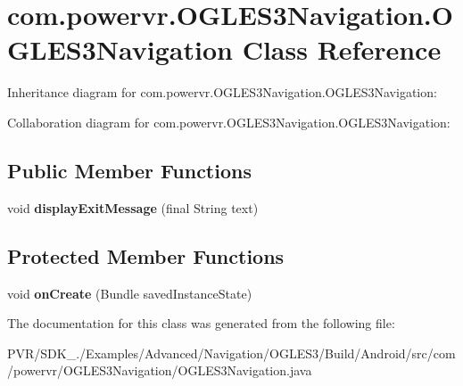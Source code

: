 \hypertarget{classcom_1_1powervr_1_1_o_g_l_e_s3_navigation_1_1_o_g_l_e_s3_navigation}{\section{com.\+powervr.\+O\+G\+L\+E\+S3\+Navigation.\+O\+G\+L\+E\+S3\+Navigation Class Reference}
\label{classcom_1_1powervr_1_1_o_g_l_e_s3_navigation_1_1_o_g_l_e_s3_navigation}
}


Inheritance diagram for com.\+powervr.\+O\+G\+L\+E\+S3\+Navigation.\+O\+G\+L\+E\+S3\+Navigation\+:


Collaboration diagram for com.\+powervr.\+O\+G\+L\+E\+S3\+Navigation.\+O\+G\+L\+E\+S3\+Navigation\+:
\subsection*{Public Member Functions}
\begin{DoxyCompactItemize}
\item 
\hypertarget{classcom_1_1powervr_1_1_o_g_l_e_s3_navigation_1_1_o_g_l_e_s3_navigation_a4972326c8caf06fb0307be1b7124f628}{void {\bfseries display\+Exit\+Message} (final String text)}\label{classcom_1_1powervr_1_1_o_g_l_e_s3_navigation_1_1_o_g_l_e_s3_navigation_a4972326c8caf06fb0307be1b7124f628}

\end{DoxyCompactItemize}
\subsection*{Protected Member Functions}
\begin{DoxyCompactItemize}
\item 
\hypertarget{classcom_1_1powervr_1_1_o_g_l_e_s3_navigation_1_1_o_g_l_e_s3_navigation_a0eeac0322fce1bbb8e1e744b6d22ecc3}{void {\bfseries on\+Create} (Bundle saved\+Instance\+State)}\label{classcom_1_1powervr_1_1_o_g_l_e_s3_navigation_1_1_o_g_l_e_s3_navigation_a0eeac0322fce1bbb8e1e744b6d22ecc3}

\end{DoxyCompactItemize}


The documentation for this class was generated from the following file\+:\begin{DoxyCompactItemize}
\item 
P\+V\+R/\+S\+D\+K\+\_./\+Examples/\+Advanced/\+Navigation/\+O\+G\+L\+E\+S3/\+Build/\+Android/src/com/powervr/\+O\+G\+L\+E\+S3\+Navigation/O\+G\+L\+E\+S3\+Navigation.\+java\end{DoxyCompactItemize}
